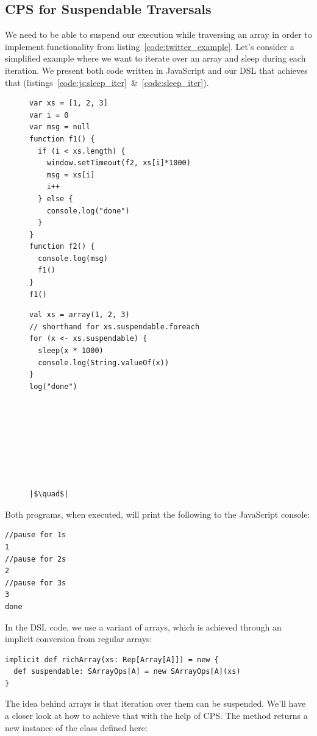 \documentclass[runningheads,a4paper]{llncs}
\begin{document}
\subsection{CPS for Suspendable Traversals}
We need to be able to suspend our execution while traversing an array in order to implement functionality from listing~\ref{code:twitter_example}. Let's consider a simplified example where we want to iterate over an array and sleep during each iteration. We present both code written in JavaScript and our DSL that achieves that (listings~\ref{code:js:sleep_iter}~\&~\ref{code:sleep_iter}).
\begin{figure}
\lstset{basicstyle=\ttfamily\scriptsize}
\begin{changemargin}{-0.7cm}{-0.7cm}
\setlength{\columnseprule}{0.5pt}
\begin{multicols}{2}
\begin{lstlisting}[caption=JavaScript,label=code:js:sleep_iter]
var xs = [1, 2, 3]
var i = 0
var msg = null
function f1() {
  if (i < xs.length) {
    window.setTimeout(f2, xs[i]*1000)
    msg = xs[i]
    i++
  } else {
    console.log("done")
  }
}
function f2() {
  console.log(msg)
  f1()
}
f1()
\end{lstlisting}
\begin{lstlisting}[escapechar=|,caption=DSL,label=code:sleep_iter]
val xs = array(1, 2, 3)
// shorthand for xs.suspendable.foreach
for (x <- xs.suspendable) {
  sleep(x * 1000)
  console.log(String.valueOf(x))
}
log("done")








|$\quad$|
\end{lstlisting}
\end{multicols}
\end{changemargin}
\lstset{basicstyle=\ttfamily}
\end{figure}

Both programs, when executed, will print the following to the JavaScript console:
\begin{lstlisting}
//pause for 1s
1
//pause for 2s
2
//pause for 3s
3
done
\end{lstlisting}

In the DSL code, we use a  variant of arrays, which is achieved through an implicit conversion from regular arrays:
\begin{lstlisting}
implicit def richArray(xs: Rep[Array[A]]) = new {
  def suspendable: SArrayOps[A] = new SArrayOps[A](xs)
}
\end{lstlisting}
The idea behind  arrays is that iteration over them can be suspended. We'll have a closer look at how to achieve that with the help of CPS. The  method returns a new instance of the  class defined here:
\end{document}
